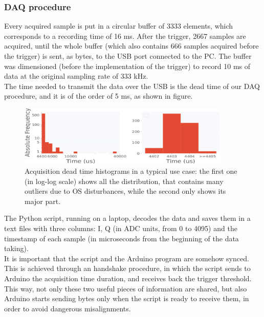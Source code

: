 \documentclass[12pt]{article}
\begin{document}
\subsubsection{DAQ procedure}
Every acquired sample is put in a circular buffer of 3333 elements, which corresponds to a recording time of 16 ms. After the trigger, 2667 samples are acquired, until the whole buffer (which also contains 666 samples acquired before the trigger) is sent, as bytes, to the USB port connected to the PC.
The buffer was dimensioned (before the implementation of the trigger) to record 10 ms of data at the original sampling rate of 333 kHz.
\\
The time needed to transmit the data over the USB is the dead time of our DAQ procedure, and it is of the order of 5 ms, as shown in figure.
\begin{figure}[H]
\centering
    \includegraphics[width=0.9\textwidth]{dead_time_hist.pdf}
    \footnotesize{\caption{Acquisition dead time histograms in a typical use case: the first one (in log-log scale) shows all the distribution, that contains many outliers due to OS disturbances, while the second only shows its major part.}}
\end{figure}
The Python script, running on a laptop, decodes the data and saves them in a text files with three columns: I, Q (in ADC units, from 0 to 4095) and the timestamp of each sample (in microseconds from the beginning of the data taking).\\
It is important that the script and the Arduino program are somehow synced. This is achieved through an handshake procedure, in which the script sends to Arduino the acquisition time duration, and receives back the trigger threshold. This way, not only these two useful pieces of information are shared, but also Arduino starts sending bytes only when the script is ready to receive them, in order to avoid dangerous misalignments.
\end{document}
